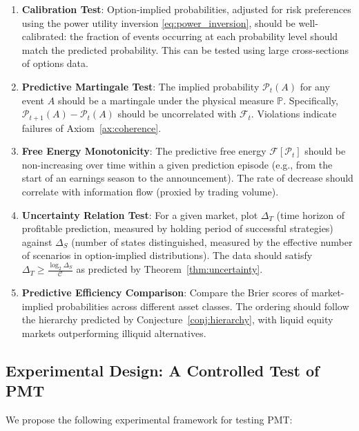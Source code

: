 \documentclass[12pt,a4paper]{article}
\theoremstyle{definition}
\newcommand{\Prob}{\mathbb{P}}
\newcommand{\F}{\mathcal{F}}
\newcommand{\PP}{\mathcal{P}}
\begin{document}
\begin{enumerate}
    \item \textbf{Calibration Test}: Option-implied probabilities, adjusted for risk preferences using the power utility inversion \eqref{eq:power_inversion}, should be well-calibrated: the fraction of events occurring at each probability level should match the predicted probability. This can be tested using large cross-sections of options data.
    
    \item \textbf{Predictive Martingale Test}: The implied probability $\PP_t(A)$ for any event $A$ should be a martingale under the physical measure $\Prob$. Specifically, $\PP_{t+1}(A) - \PP_t(A)$ should be uncorrelated with $\F_t$. Violations indicate failures of Axiom~\ref{ax:coherence}.
    
    \item \textbf{Free Energy Monotonicity}: The predictive free energy $\mathcal{F}[\PP_t]$ should be non-increasing over time within a given prediction episode (e.g., from the start of an earnings season to the announcement). The rate of decrease should correlate with information flow (proxied by trading volume).
    
    \item \textbf{Uncertainty Relation Test}: For a given market, plot $\Delta_T$ (time horizon of profitable prediction, measured by holding period of successful strategies) against $\Delta_S$ (number of states distinguished, measured by the effective number of scenarios in option-implied distributions). The data should satisfy $\Delta_T \geq \frac{\log_2 \Delta_S}{\mathcal{C}}$ as predicted by Theorem~\ref{thm:uncertainty}.
    
    \item \textbf{Predictive Efficiency Comparison}: Compare the Brier scores of market-implied probabilities across different asset classes. The ordering should follow the hierarchy predicted by Conjecture~\ref{conj:hierarchy}, with liquid equity markets outperforming illiquid alternatives.
\end{enumerate}

\subsection{Experimental Design: A Controlled Test of PMT}

We propose the following experimental framework for testing PMT:
\end{document}
